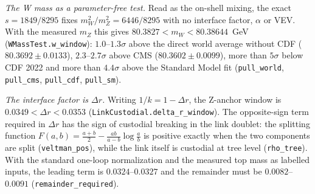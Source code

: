 \textit{The W mass as a parameter-free test.} Read as the on-shell mixing, the exact $s=1849/8295$ fixes $m_W^2/m_Z^2=6446/8295$ with no interface factor, $\alpha$ or VEV. With the measured $m_Z$ this gives $80.3827<m_W<80.38644$~GeV (\texttt{WMassTest.w\_window}): $1.0$--$1.3\sigma$ above the direct world average without CDF ($80.3692\pm0.0133$), $2.3$--$2.7\sigma$ above CMS ($80.3602\pm0.0099$), more than $5\sigma$ below CDF 2022 and more than $4.4\sigma$ above the Standard Model fit (\texttt{pull\_world}, \texttt{pull\_cms}, \texttt{pull\_cdf}, \texttt{pull\_sm}).

\textit{The interface factor is $\Delta r$.} Writing $1/k=1-\Delta r$, the Z-anchor window is $0.0349<\Delta r<0.0353$ (\texttt{LinkCustodial.delta\_r\_window}). The opposite-sign term required in $\Delta r$ has the sign of custodial breaking in the link doublet: the splitting function $F(a,b)=\tfrac{a+b}{2}-\tfrac{ab}{a-b}\log\tfrac ab$ is positive exactly when the two components are split (\texttt{veltman\_pos}), while the link itself is custodial at tree level (\texttt{rho\_tree}). With the standard one-loop normalization and the measured top mass as labelled inputs, the leading term is $0.0324$--$0.0327$ and the remainder must be $0.0082$--$0.0091$ (\texttt{remainder\_required}).

